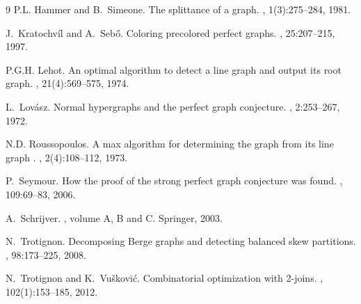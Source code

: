 \documentclass[11 pt] {article}
\begin{document}
\begin {thebibliography}{9}
P.L. Hammer and B.~Simeone.
\newblock The splittance of a graph.
, 1(3):275--284, 1981.

J.~Kratochv{\'i}l and A.~Seb{\H o}.
\newblock Coloring precolored perfect graphs.
, 25:207--215, 1997.



P.G.H. Lehot.
\newblock An optimal algorithm to detect a line graph and output its root
  graph.
,
  21(4):569--575, 1974.

L.~Lov{\'a}sz.
\newblock Normal hypergraphs and the perfect graph conjecture.
, 2:253--267, 1972.

N.D. Roussopoulos.
\newblock A max  algorithm for determining the graph {} from its
  line graph {}.
, 2(4):108--112, 1973.

P.~Seymour.
\newblock How the proof of the strong perfect graph conjecture was found.
, 109:69--83, 2006.

A.~Schrijver.
, volume A,
  B and C.
\newblock Springer, 2003.

N.~Trotignon.
\newblock Decomposing {B}erge graphs and detecting balanced skew partitions.
, 98:173--225, 2008.


N.~Trotignon and K.~Vu{\v s}kovi{\'c}.
\newblock Combinatorial optimization with 2-joins.
, 102(1):153--185,
  2012.
\end{thebibliography}
\end{document}

